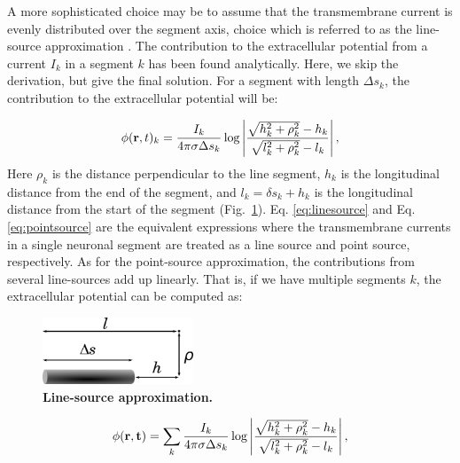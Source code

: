 A more sophisticated choice may be to assume that the transmembrane current is evenly distributed over the segment axis, choice which is referred to as the line-source approximation \citep{Holt1999, Linden2014}. The contribution to the extracellular potential from a current $I_k$ in a segment $k$ has been found analytically. Here, we skip the derivation, but give the final solution. For a segment with length $\Delta s_k$, the contribution to the extracellular potential will be:

\begin{equation}
\phi({\bf r},t)_k = \frac{I_k}{4\pi \sigma \Delta s_k} \log \left| \frac{\sqrt{h_k^2+\rho_k^2}-h_k}{\sqrt{l_k^2+\rho_k^2}-l_k} \right|,
\label{eq:linesource}
\end{equation}
Here $\rho_k$ is the distance perpendicular to the line segment, $h_k$ is the longitudinal distance from the end of the segment, and $l_k = \delta s_k + h_k$ is the longitudinal distance from the start of the segment (Fig.~\ref{fig:line_source_illustration}). Eq. \ref{eq:linesource} and Eq. \ref{eq:pointsource} are the equivalent expressions where the transmembrane currents in a single neuronal segment are treated as a line source and point source, respectively. As for the point-source approximation, the contributions from several line-sources add up linearly. That is, if we have multiple segments $k$, the extracellular potential can be computed as:
\begin{figure}[!ht]
\begin{center}
\includegraphics[width=0.4\textwidth]{Figures/line_source_illustration.png}
\end{center}
\caption{\textbf{Line-source approximation.} 
\cite{Holt1998} 
}
\label{fig:line_source_illustration}
\end{figure}

\begin{equation}
\phi({\bf r},{\bf t}) = \sum_k \frac{I_k}{4\pi \sigma \Delta s_k} \log \left| \frac{\sqrt{h_k^2+\rho_k^2}-h_k}{\sqrt{l_k^2+\rho_k^2}-l_k} \right|,
\label{eq:linesources}
\end{equation}

